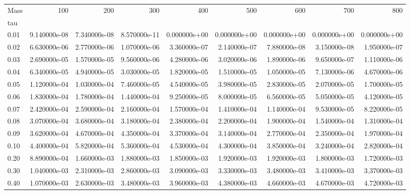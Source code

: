 \begin{tabular}{lrrrrrrrr}
\toprule
Mass &           100 &           200 &           300 &           400 &           500 &           600 &           700 &           800 \\
tau   &               &               &               &               &               &               &               &               \\
\midrule
0.01  &  9.140000e-08 &  7.340000e-08 &  8.570000e-11 &  0.000000e+00 &  0.000000e+00 &  0.000000e+00 &  0.000000e+00 &  0.000000e+00 \\
0.02  &  6.630000e-06 &  2.770000e-06 &  1.070000e-06 &  3.360000e-07 &  2.140000e-07 &  7.880000e-08 &  3.150000e-08 &  1.950000e-07 \\
0.03  &  2.690000e-05 &  1.570000e-05 &  9.560000e-06 &  4.280000e-06 &  3.020000e-06 &  1.890000e-06 &  9.650000e-07 &  1.110000e-06 \\
0.04  &  6.340000e-05 &  4.940000e-05 &  3.030000e-05 &  1.820000e-05 &  1.510000e-05 &  1.050000e-05 &  7.130000e-06 &  4.670000e-06 \\
0.05  &  1.120000e-04 &  1.030000e-04 &  7.460000e-05 &  4.540000e-05 &  3.980000e-05 &  2.830000e-05 &  2.070000e-05 &  1.700000e-05 \\
0.06  &  1.830000e-04 &  1.780000e-04 &  1.440000e-04 &  9.250000e-05 &  8.000000e-05 &  6.560000e-05 &  5.050000e-05 &  4.120000e-05 \\
0.07  &  2.420000e-04 &  2.590000e-04 &  2.160000e-04 &  1.570000e-04 &  1.410000e-04 &  1.140000e-04 &  9.530000e-05 &  8.220000e-05 \\
0.08  &  3.070000e-04 &  3.680000e-04 &  3.180000e-04 &  2.380000e-04 &  2.200000e-04 &  1.900000e-04 &  1.540000e-04 &  1.310000e-04 \\
0.09  &  3.620000e-04 &  4.670000e-04 &  4.350000e-04 &  3.370000e-04 &  3.140000e-04 &  2.770000e-04 &  2.350000e-04 &  1.970000e-04 \\
0.10  &  4.400000e-04 &  5.820000e-04 &  5.360000e-04 &  4.530000e-04 &  4.300000e-04 &  3.850000e-04 &  3.240000e-04 &  2.820000e-04 \\
0.20  &  8.890000e-04 &  1.660000e-03 &  1.880000e-03 &  1.850000e-03 &  1.920000e-03 &  1.920000e-03 &  1.800000e-03 &  1.720000e-03 \\
0.30  &  1.040000e-03 &  2.310000e-03 &  2.860000e-03 &  3.090000e-03 &  3.330000e-03 &  3.480000e-03 &  3.410000e-03 &  3.370000e-03 \\
0.40  &  1.070000e-03 &  2.630000e-03 &  3.480000e-03 &  3.960000e-03 &  4.380000e-03 &  4.660000e-03 &  4.670000e-03 &  4.720000e-03 \\

\end{tabular}
